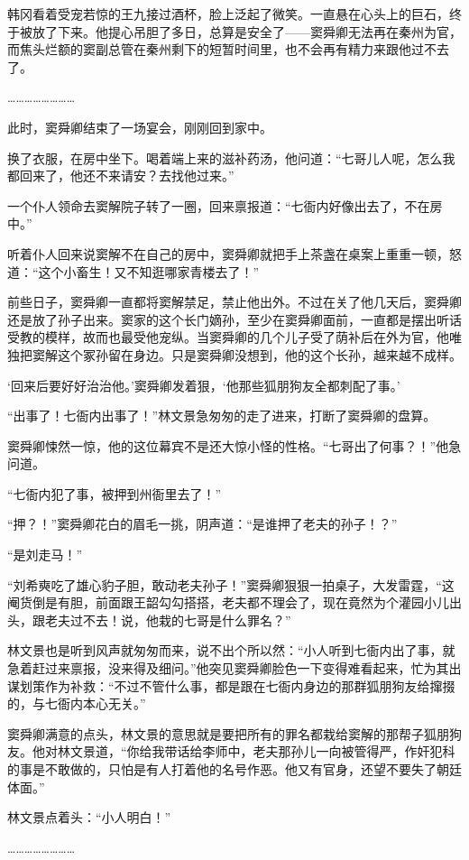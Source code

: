 韩冈看着受宠若惊的王九接过酒杯，脸上泛起了微笑。一直悬在心头上的巨石，终于被放了下来。他提心吊胆了多日，总算是安全了——窦舜卿无法再在秦州为官，而焦头烂额的窦副总管在秦州剩下的短暂时间里，也不会再有精力来跟他过不去了。

……………………

此时，窦舜卿结束了一场宴会，刚刚回到家中。

换了衣服，在房中坐下。喝着端上来的滋补药汤，他问道：“七哥儿人呢，怎么我都回来了，他还不来请安？去找他过来。”

一个仆人领命去窦解院子转了一圈，回来禀报道：“七衙内好像出去了，不在房中。”

听着仆人回来说窦解不在自己的房中，窦舜卿就把手上茶盏在桌案上重重一顿，怒道：“这个小畜生！又不知逛哪家青楼去了！”

前些日子，窦舜卿一直都将窦解禁足，禁止他出外。不过在关了他几天后，窦舜卿还是放了孙子出来。窦家的这个长门嫡孙，至少在窦舜卿面前，一直都是摆出听话受教的模样，故而也最受他宠纵。当窦舜卿的几个儿子受了荫补后在外为官，他唯独把窦解这个冢孙留在身边。只是窦舜卿没想到，他的这个长孙，越来越不成样。

‘回来后要好好治治他。’窦舜卿发着狠，‘他那些狐朋狗友全都刺配了事。’

“出事了！七衙内出事了！”林文景急匆匆的走了进来，打断了窦舜卿的盘算。

窦舜卿悚然一惊，他的这位幕宾不是还大惊小怪的性格。“七哥出了何事？！”他急问道。

“七衙内犯了事，被押到州衙里去了！”

“押？！”窦舜卿花白的眉毛一挑，阴声道：“是谁押了老夫的孙子！？”

“是刘走马！”

“刘希奭吃了雄心豹子胆，敢动老夫孙子！”窦舜卿狠狠一拍桌子，大发雷霆，“这阉货倒是有胆，前面跟王韶勾勾搭搭，老夫都不理会了，现在竟然为个灌园小儿出头，跟老夫过不去！说，他栽的七哥是什么罪名？”

林文景也是听到风声就匆匆而来，说不出个所以然：“小人听到七衙内出了事，就急着赶过来禀报，没来得及细问。”他突见窦舜卿脸色一下变得难看起来，忙为其出谋划策作为补救：“不过不管什么事，都是跟在七衙内身边的那群狐朋狗友给撺掇的，与七衙内本心无关。”

窦舜卿满意的点头，林文景的意思就是要把所有的罪名都栽给窦解的那帮子狐朋狗友。他对林文景道，“你给我带话给李师中，老夫那孙儿一向被管得严，作奸犯科的事是不敢做的，只怕是有人打着他的名号作恶。他又有官身，还望不要失了朝廷体面。”

林文景点着头：“小人明白！”

……………………

